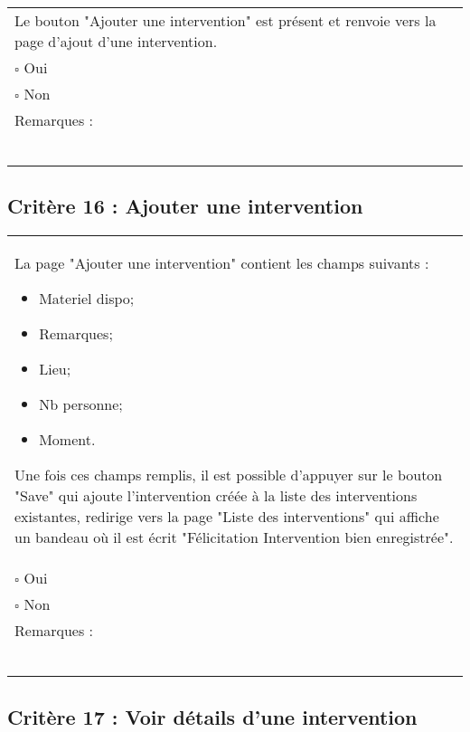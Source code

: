 	\begin{center}
    	 		\begin{tabular}[h]{|p{}|}
			\hline
				Le bouton "Ajouter une intervention" est présent et renvoie vers la page d'ajout d'une intervention. \\
				$\square$ Oui  \\ $\square$ Non \\\hline Remarques : \\ ~\\
			 \\\hline
     		\end{tabular}
  		\end{center}	
  		
  		
  	\subsection*{Critère 16 : Ajouter une intervention}
	
	\begin{center}
    	 		\begin{tabular}[h]{|p{}|}
			\hline
				La page "Ajouter une intervention"  contient les champs suivants : 
				\begin{itemize}
					\item Materiel dispo;
					\item Remarques;
					\item Lieu;
					\item Nb personne;
					\item Moment.
				\end{itemize}
				Une fois ces champs remplis, il est possible d'appuyer sur le bouton "Save" qui ajoute l'intervention créée à la liste des interventions existantes, redirige vers la page "Liste des interventions" qui affiche un bandeau où il est écrit "Félicitation Intervention bien enregistrée". \\
				$\square$ Oui  \\ $\square$ Non \\\hline Remarques : \\ ~\\
			 \\\hline
     		\end{tabular}
  		\end{center}	
  		
  		
  		\subsection*{Critère 17 : Voir détails d'une intervention}
	
